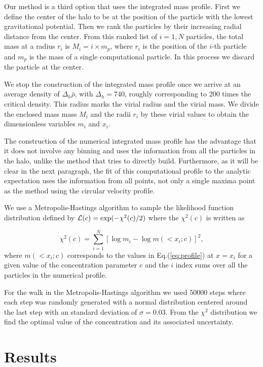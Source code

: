\documentclass[useAMS,usenatbib]{mn2e}
\begin{document}
Our method is a third option that uses the integrated mass profile.
First we define the center of the halo to be at the position of the
particle with the lowest gravitational potential.
Then we rank the particles by their increasing radial distance from
the center.
From this ranked list of $i=1,N$ particles, the total mass at a radius
$r_i$ is $M_i=i\times m_p$, where $r_i$ is
the position of the $i$-th particle and $m_p$ is the mass of a single
computational particle.
In this process we discard the particle at the center.

We stop the construction of the integrated mass profile once we arrive
at an average density of $\Delta_h\bar{\rho}$, with $\Delta_h=740$,
roughly corresponding to 200 times the critical density. 
This radius marks the virial radius and the virial mass. 
We divide the enclosed mass mass $M_i$ and the radii $r_i$ by these
virial values to obtain the dimensionless variables $m_i$ and $x_i$.

The construction of the numerical integrated mass profile has the
advantage that it does not involve any binning and uses the
information from all the particles in the halo, unlike the method that
tries to directly build. 
Furthermore, as it will be clear in the next paragraph, the fit of
this computational profile to the analytic expectation uses the
information from all points, not only a single maxima point as the
method using the circular velocity profile. 

We use a Metropolis-Hastings algorithm to sample the likelihood
function distribution defined by ${\cal L}(c)=\exp(-\chi^2(c)/2)$
where the $\chi^2(c)$ is written as

\begin{equation}
\chi^2(c)= \sum_{i=1}^{N}[\log m_i - \log m(< x_i;c)]^2,
\end{equation}
%
where $m(<x_i;c)$ corresponds to the values in Eq.(\ref{eq:profile}) at
$x=x_i$ for a given value of the concentration parameter $c$ and the
$i$ index sums over all the particles in the numerical profile.

For the walk in the Metropolis-Hastings algorithm we used 50000 steps
where each step was randomly generated with a normal distribution
centered around the last step with an standard deviation of
$\sigma=0.03$. 
From the $\chi^2$ distribution we find the optimal value of the
concentration and  its associated uncertainty.

\section{Results}
\label{sec:results}
\end{document}
